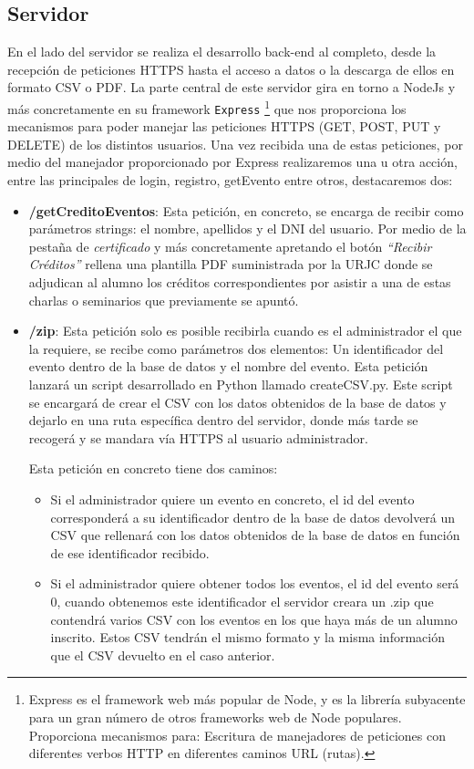 \documentclass[a4paper, 12pt]{book}
\begin{document}
\subsection{Servidor}
	En el lado del servidor se realiza el desarrollo back-end al completo, desde la recepción de peticiones HTTPS hasta el acceso a datos o la descarga de ellos en formato CSV o PDF.
	La parte central de este servidor gira en torno a NodeJs y más concretamente en su framework \texttt{Express} \footnote{Express es el framework web más popular de Node, y es la librería subyacente para un gran número de otros frameworks web de Node populares. Proporciona mecanismos para: Escritura de manejadores de peticiones con diferentes verbos HTTP en diferentes caminos URL (rutas).}  que nos proporciona los mecanismos para poder manejar las peticiones HTTPS (GET, POST, PUT y DELETE) de los distintos usuarios. Una vez recibida una de estas peticiones, por medio del manejador proporcionado por Express realizaremos una u otra acción, entre las principales de login, registro, getEvento entre otros, destacaremos dos:
	
\begin{itemize}
	\item \textbf{/getCreditoEventos}: Esta petición, en concreto, se encarga de recibir como parámetros strings: el nombre, apellidos y el DNI del usuario. Por medio de la pestaña de \textit{certificado} y más concretamente apretando el botón \textit{``Recibir Créditos''} rellena una plantilla PDF suministrada por la URJC donde se adjudican al alumno los créditos correspondientes por asistir a una de estas charlas o seminarios que previamente se apuntó.
	

	\item \textbf{/zip}: Esta petición solo es posible recibirla cuando es el administrador el que la requiere, se recibe como parámetros dos elementos: Un identificador del evento dentro de la base de datos y el nombre del evento. Esta petición lanzará un script desarrollado en Python llamado createCSV.py. Este script se encargará de crear el CSV con los datos obtenidos de la base de datos y dejarlo en una ruta específica dentro del servidor, donde más tarde se recogerá y se mandara vía HTTPS al usuario administrador.

Esta petición en concreto tiene dos caminos:
\begin{itemize}
	\item  Si el administrador quiere un evento en concreto, el id del evento corresponderá a su identificador dentro de la base de datos devolverá un CSV que rellenará con los datos obtenidos de la base de datos en función de ese identificador recibido. 
	\item Si el administrador quiere obtener todos los eventos, el id del evento será 0, cuando obtenemos este identificador el servidor creara un .zip que contendrá varios CSV con los eventos en los que haya más de un alumno inscrito. Estos CSV tendrán el mismo formato y la misma información que el CSV devuelto en el caso anterior.
\end{itemize}
\end{itemize}
\end{document}
